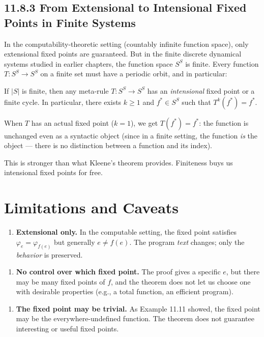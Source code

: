 \subsection{11.8.3 From Extensional to Intensional Fixed Points in Finite Systems}

In the computability-theoretic setting (countably infinite function space), only extensional fixed points are guaranteed. But in the finite discrete dynamical systems studied in earlier chapters, the function space $S^S$ is finite. Every function $T: S^S \to S^S$ on a finite set must have a periodic orbit, and in particular:

\begin{proposition}
If $|S|$ is finite, then any meta-rule $T: S^S \to S^S$ has an \textit{intensional} fixed point or a finite cycle. In particular, there exists $k \geq 1$ and $f^* \in S^S$ such that $T^k(f^*) = f^*$.

When $T$ has an actual fixed point ($k = 1$), we get $T(f^*) = f^*$: the function is unchanged even as a syntactic object (since in a finite setting, the function \textit{is} the object --- there is no distinction between a function and its index).

This is stronger than what Kleene's theorem provides. Finiteness buys us intensional fixed points for free.
\end{proposition}

\section{Limitations and Caveats}

\begin{enumerate}
\item \textbf{Extensional only.} In the computable setting, the fixed point satisfies $\varphi_e = \varphi_{f(e)}$ but generally $e \neq f(e)$. The program \textit{text} changes; only the \textit{behavior} is preserved.
\end{enumerate}

\begin{enumerate}
\item \textbf{No control over which fixed point.} The proof gives a specific $e$, but there may be many fixed points of $f$, and the theorem does not let us choose one with desirable properties (e.g., a total function, an efficient program).
\end{enumerate}

\begin{enumerate}
\item \textbf{The fixed point may be trivial.} As Example 11.11 showed, the fixed point may be the everywhere-undefined function. The theorem does not guarantee interesting or useful fixed points.
\end{enumerate}

